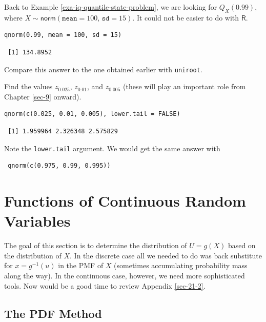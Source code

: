 \documentclass[captions=tableheading]{scrbook}
\begin{document}
\begin{example}
Back to Example \ref{exa-iq-quantile-state-problem}, we are looking for \(Q_{X}(0.99)\), where \(X\sim\mathsf{norm}(\mathtt{mean}=100,\,\mathtt{sd}=15)\). It could not be easier to do with \(\mathsf{R}\). 


\lstset{language=R}
\begin{lstlisting}
qnorm(0.99, mean = 100, sd = 15)
\end{lstlisting}

\begin{verbatim}
 [1] 134.8952
\end{verbatim}

Compare this answer to the one obtained earlier with \texttt{uniroot}.
\end{example}

\begin{example}
Find the values \(z_{0.025}\), \(z_{0.01}\), and \(z_{0.005}\) (these will play an important role from Chapter \ref{sec-9} onward).
\end{example}


\lstset{language=R}
\begin{lstlisting}
qnorm(c(0.025, 0.01, 0.005), lower.tail = FALSE)
\end{lstlisting}

\begin{verbatim}
 [1] 1.959964 2.326348 2.575829
\end{verbatim}

Note the \texttt{lower.tail} argument. We would get the same answer with
\begin{verbatim}
 qnorm(c(0.975, 0.99, 0.995))
\end{verbatim}
\section{Functions of Continuous Random Variables}
\label{sec-6-4}
\label{sec-Functions-of-Continuous}


The goal of this section is to determine the distribution of \(U=g(X)\) based on the distribution of \(X\). In the discrete case all we needed to do was back substitute for \(x=g^{-1}(u)\) in the PMF of \(X\) (sometimes accumulating probability mass along the way). In the continuous case, however, we need more sophisticated tools. Now would be a good time to review Appendix \ref{sec-21-2}.
\subsection{The PDF Method}
\label{sec-6-4-1}
\end{document}
